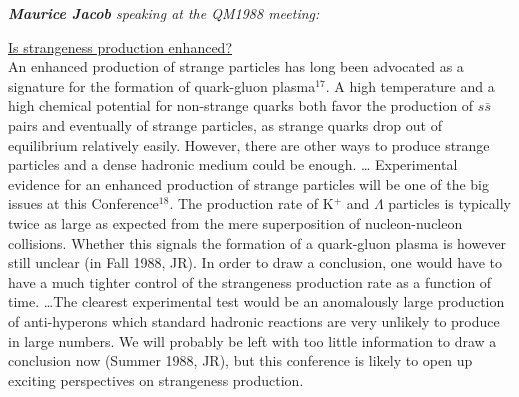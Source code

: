\noindent\textit{\textbf{Maurice Jacob} speaking at the QM1988 meeting:}\\[-0.7cm]
%
\begin{mdframed}[linecolor=gray,roundcorner=12pt,backgroundcolor=GreenYellow!15,linewidth=1pt,leftmargin=0cm,rightmargin=0cm,topline=true,bottomline=true,skipabove=12pt]\relax%
%
\underline{Is strangeness production enhanced?}\\ 
An enhanced production of strange particles has long been advocated as a signature for the formation of quark-gluon plasma$^{17}$.
A high temperature and a high chemical potential for non-strange quarks both favor the production of $s\bar s$ pairs and eventually of strange particles, as strange quarks drop out of equilibrium relatively easily. However, there are other ways to produce strange particles and a dense hadronic medium could be enough. 
\ldots
Experimental evidence for an enhanced production of strange particles will be one of the big issues at this Conference$^{18}$.
The production rate of K$^+$ and $\Lambda$ particles is typically twice as large as expected from the mere superposition of nucleon-nucleon collisions. Whether this signals the formation of a quark-gluon plasma is however still unclear (in Fall 1988, JR). In order to draw a conclusion, one would have to have a much tighter control of the strangeness production rate as a function of time. 
\ldots The clearest experimental test would be an anomalously large production of anti-hyperons which standard hadronic reactions are very unlikely to produce in large numbers. We will probably be left with too little information to draw a conclusion now (Summer 1988, JR), but this conference is likely to open up exciting perspectives on strangeness production. 
%
\end{mdframed}
\vskip 0.5cm

